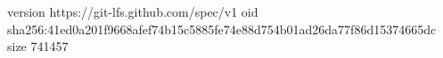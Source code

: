 version https://git-lfs.github.com/spec/v1
oid sha256:41ed0a201f9668afef74b15c5885fe74e88d754b01ad26da77f86d15374665dc
size 741457
